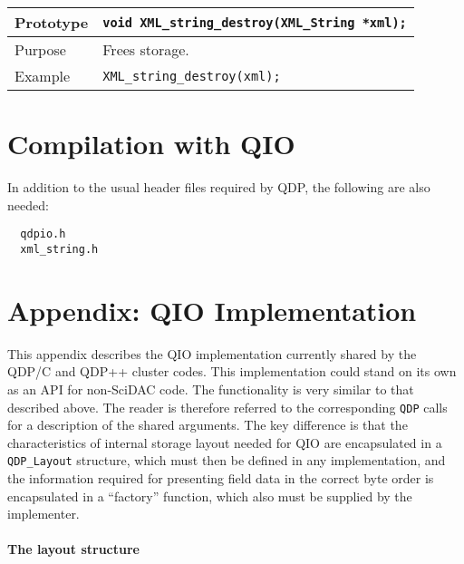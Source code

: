 \documentclass{article}
\begin{document}
\begin{flushleft}
  \begin{tabular}{|l|l|}
  \hline
  Prototype      & \verb|void XML_string_destroy(XML_String *xml);|\\
    \hline
  Purpose        & Frees storage. \\
   \hline
  Example        & \verb|XML_string_destroy(xml);| \\
   \hline
 \end{tabular}
\end{flushleft}
%


\section{Compilation with QIO}

In addition to the usual header files required by QDP, the following
are also needed:
%
\begin{verbatim}
  qdpio.h
  xml_string.h
\end{verbatim}
%

\section{Appendix: QIO Implementation}

This appendix describes the QIO implementation currently shared by the
QDP/C and QDP++ cluster codes.  This implementation could stand on its
own as an API for non-SciDAC code.  The functionality is very similar
to that described above.  The reader is therefore referred to the
corresponding \verb|QDP| calls for a description of the shared
arguments.  The key difference is that the characteristics of internal
storage layout needed for QIO are encapsulated in a \verb|QDP_Layout|
structure, which must then be defined in any implementation, and the
information required for presenting field data in the correct byte
order is encapsulated in a ``factory'' function, which also must be
supplied by the implementer.

\paragraph{The layout structure}
\end{document}
